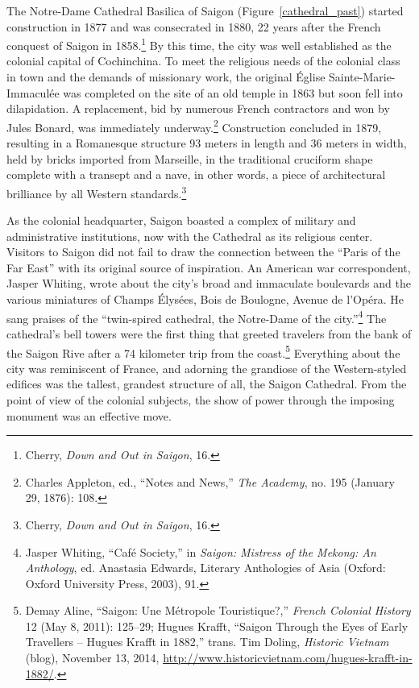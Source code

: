 The Notre-Dame Cathedral Basilica of Saigon (Figure~\ref{cathedral_past}) started construction in 1877 and was consecrated in 1880, 22 years after the French conquest of Saigon in 1858.\footnote{Cherry, \textit{Down and Out in Saigon}, 16.} By this time, the city was well established as the colonial capital of Cochinchina. To meet the religious needs of the colonial class in town and the demands of missionary work, the original Église Sainte-Marie-Immaculée was completed on the site of an old temple in 1863 but soon fell into dilapidation. A replacement, bid by numerous French contractors and won by Jules Bonard, was immediately underway.\footnote{Charles Appleton, ed., “Notes and News,” \textit{The Academy}, no. 195 (January 29, 1876): 108.} Construction concluded in 1879, resulting in a Romanesque structure 93 meters in length and 36 meters in width, held by bricks imported from Marseille, in the traditional cruciform shape complete with a transept and a nave, in other words, a piece of architectural brilliance by all Western standards.\footnote{Cherry, \textit{Down and Out in Saigon}, 16.}

As the colonial headquarter, Saigon boasted a complex of military and administrative institutions, now with the Cathedral as its religious center. Visitors to Saigon did not fail to draw the connection between the “Paris of the Far East” with its original source of inspiration. An American war correspondent, Jasper Whiting, wrote about the city's broad and immaculate boulevards and the various miniatures of Champs Élysées, Bois de Boulogne, Avenue de l’Opéra. He sang praises of the “twin-spired cathedral, the Notre-Dame of the city.”\footnote{Jasper Whiting, “Café Society,” in \textit{Saigon: Mistress of the Mekong: An Anthology}, ed. Anastasia Edwards, Literary Anthologies of Asia (Oxford: Oxford University Press, 2003), 91.} The cathedral’s bell towers were the first thing that greeted travelers from the bank of the Saigon Rive after a 74 kilometer trip from the coast.\footnote{Demay Aline, “Saigon: Une Métropole Touristique?,” \textit{French Colonial History} 12 (May 8, 2011): 125–29; Hugues Krafft, “Saigon Through the Eyes of Early Travellers – Hugues Krafft in 1882,” trans. Tim Doling, \textit{Historic Vietnam} (blog), November 13, 2014, \url{http://www.historicvietnam.com/hugues-krafft-in-1882/}.} Everything about the city was reminiscent of France, and adorning the grandiose of the Western-styled edifices was the tallest, grandest structure of all, the Saigon Cathedral. From the point of view of the colonial subjects, the show of power through the imposing monument was an effective move. \en

